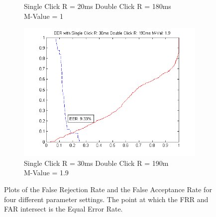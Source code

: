 \documentclass[conference]{IEEEtran}
\begin{document}
\begin{figure}[t!]
\begin{subfigure}{.5\textwidth}
  \caption{Single Click R = 20ms Double Click R = 180ms\\M-Value = 1}
  \label{fig:sfig3}
\end{subfigure}%
\begin{subfigure}{.5\textwidth}
  \centering
  \includegraphics[width=.8\linewidth]{19M}
  \caption{Single Click R = 30ms Double Click R = 190m\\ M-Value = 1.9}
  \label{fig:sfig4}
\end{subfigure}
\caption{Plots of the False Rejection Rate and the False Acceptance Rate for four different parameter settings. The point at which the FRR and FAR intersect is the Equal Error Rate. }
\label{fig:fig}
\end{figure}
\end{document}
